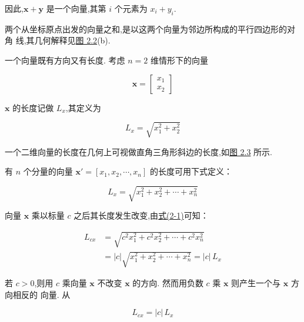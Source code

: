 因此,$\bm{x}+\bm{y}$ 是一个向量,其第 $i$ 个元素为 $x_i+y_i$.

两个从坐标原点出发的向量之和,是以这两个向量为邻边所构成的平行四边形的对角
线,其几何解释见\hyperref[fig:2.2]{图 2.2}(b).

一个向量既有方向又有长度. 考虑 $n=2$ 维情形下的向量

\[
\bm{x}=\begin{bmatrix}x_1\\x_2\end{bmatrix}
\]

$\bm{x}$ 的长度记做 $L_x$,其定义为

\[
L_x=\sqrt{x_1^2+x_2^2}
\]

一个二维向量的长度在几何上可视做直角三角形斜边的长度,如\hyperref[fig:2.3]{图 2.3} 所示.

\begin{mvfigure}
\label{fig:2.3}
\end{mvfigure}

有 $n$ 个分量的向量 $\bm{x}'=[x_1,x_2,\cdots,x_n]$ 的长度可用下式定义：

\label{eq:2-1}
\begin{equation}
L_x=\sqrt{x_1^2+x_2^2+\cdots+x_n^2} \tag{2-1}
\end{equation}

向量 $\bm{x}$ 乘以标量 $c$ 之后其长度发生改变,由\hyperref[eq:2-1]{式(2-1)}可知：

\begin{align*}
L_{cx}&=\sqrt{c^2x_1^2+c^2x_2^2+\cdots+c^2x_n^2}\\
&=|c|\sqrt{x_1^2+x_2^2+\cdots+x_n^2}=|c|\,L_x
\end{align*}

若 $c>0$,则用 $c$ 乘向量 $\bm{x}$ 不改变 $\bm{x}$ 的方向. 然而用负数 $c$ 乘 $\bm{x}$ 则产生一个与 $\bm{x}$ 方向相反的
向量. 从

\label{eq:2-2}
\begin{equation}
L_{cx}=|c|\,L_x \tag{2-2}
\end{equation}
